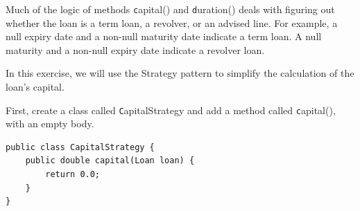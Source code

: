 \documentclass[a4paper,11pt]{memoir}
\newcommand{\code}[1]{{\texttt #1}}
\begin{document}
Much of the logic of methods \code{capital()} and \code{duration()} deals with figuring out whether the loan is a term loan, a revolver, or an advised line. 
For example, a null expiry date and a non-null maturity date indicate a term loan. 
A null maturity and a non-null expiry date indicate a revolver loan.

In this exercise, we will use the Strategy pattern to simplify the calculation of the loan's capital.
	

\begin{exercise}
	First, create a class called \code{CapitalStrategy} and add a method called \code{capital()}, with an empty body. 
\end{exercise}
\begin{solution}
\begin{lstlisting}[caption=cap,label=lst:lab]
public class CapitalStrategy {
    public double capital(Loan loan) {
        return 0.0;
    }
}
\end{lstlisting}
\end{solution}
\end{document}
